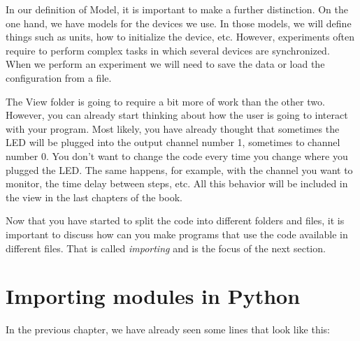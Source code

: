 
In our definition of Model, it is important to make a further distinction. On the one hand, we have models for the devices we use. In those models, we will define things such as units, how to initialize the device, etc. However, experiments often require to perform complex tasks in which several devices are synchronized. When we perform an experiment we will need to save the data or load the configuration from a file. 


The View folder is going to require a bit more of work than the other two. However, you can already start thinking about how the user is going
to interact with your program. Most likely, you have already thought that sometimes the {LED} will be plugged into the output channel number 1,
sometimes to channel number 0. You don't want to change the code every time you change where you plugged the LED. The same happens, for example, with the channel you want to monitor, the time delay between steps, etc. All this behavior will be included in the view in the last chapters of the book. 

Now that you have started to split the code into different folders and files, it is important to discuss how can you make programs that use the code available in different files. That is called \emph{importing} and is the focus of the next section. 

\section{Importing modules in Python}\label{section:importing-python}
In the previous chapter, we have already seen some lines that look like this:

